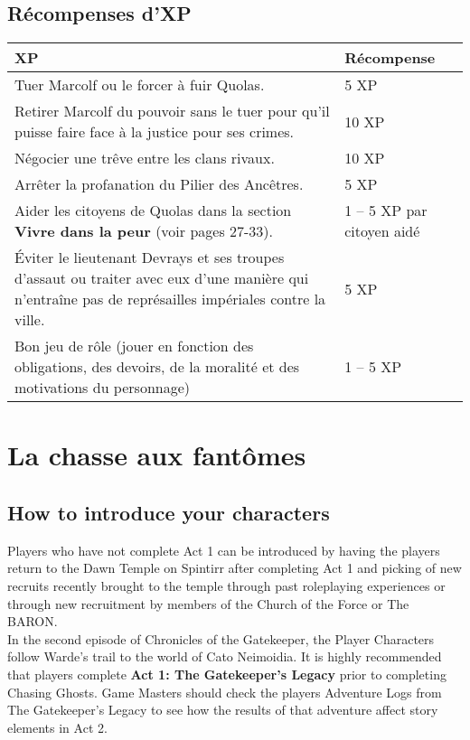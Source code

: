 \documentclass[twoside]{article}
\begin{document}
\subsection{Récompenses d'XP}
\begin{tabular}{|p{12cm}|p{4cm}|}
	\hline 
	\cellcolor{DarkRed} {\large \textcolor{PureWhite}{\textbf{XP}}} & \cellcolor{DarkRed} {\large \textcolor{PureWhite}{\textbf{Récompense}}} \\ 
	\hline 
	Tuer Marcolf ou le forcer à fuir Quolas. & 5 XP \\ 
	\hline 
	Retirer Marcolf du pouvoir sans le tuer pour qu'il puisse faire face à la justice pour ses crimes. & 10 XP \\ 
	\hline 
	Négocier une trêve entre les clans rivaux. & 10 XP \\
	\hline 
	Arrêter la profanation du Pilier des Ancêtres. & 5 XP \\
	\hline 
	Aider les citoyens de Quolas dans la section \textbf{Vivre dans la peur} (voir pages 27-33).	 & 1 -- 5 XP par citoyen aidé \\
	\hline 
	Éviter le lieutenant Devrays et ses troupes d'assaut ou traiter avec eux d'une manière qui n'entraîne pas de représailles impériales contre la ville. & 5 XP \\
	\hline 
	Bon jeu de rôle (jouer en fonction des obligations, des devoirs, de la moralité et des motivations du personnage) & 1 -- 5 XP \\
	\hline 
\end{tabular}


\section{La chasse aux fantômes}
\subsection{How to introduce your characters}
Players who have not complete Act 1 can be introduced by having the players return to the Dawn Temple on Spintirr after completing Act 1 and picking of new recruits recently brought to the temple through past roleplaying experiences or through new recruitment by members of the Church of the Force or The BARON.\\

In the second episode of Chronicles of the Gatekeeper, the Player Characters follow Warde's trail to the world of Cato Neimoidia.  It is highly recommended that players complete \textbf{Act 1: The Gatekeeper's Legacy} prior to completing Chasing Ghosts.  Game Masters should check the players Adventure Logs from The Gatekeeper's Legacy to see how the results of that adventure affect story elements in Act 2.\\
\end{document}
